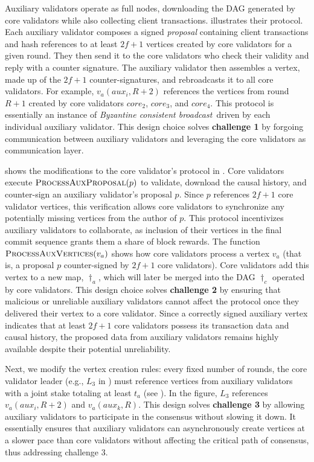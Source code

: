 Auxiliary validators operate as full nodes, downloading the DAG generated by core validators while also collecting client transactions.  illustrates their protocol. Each auxiliary validator composes a signed \emph{proposal} containing client transactions and hash references to at least $2f + 1$ vertices created by core validators for a given round. They then send it to the core validators who check their validity and reply with a counter signature. The auxiliary validator then assembles a vertex, made up of the $2f + 1$ counter-signatures, and rebroadcasts it to all core validators. For example, $v_a(aux_i, R+2)$ references the vertices from round $R+1$ created by core validators $core_2$, $core_3$, and $core_4$. This protocol is essentially an instance of \emph{Byzantine consistent broadcast}~\cite{cachin2011introduction}driven by each individual auxiliary validator.
%
This design choice solves \textbf{challenge 1} by forgoing communication between auxiliary validators and leveraging the core validators as communication layer.

 shows the modifications to the core validator's protocol in . Core validators execute $\Call{ProcessAuxProposal}{p}$ to validate, download the causal history, and counter-sign an auxiliary validator's proposal $p$. Since $p$ references $2f + 1$ core validator vertices, this verification allows core validators to synchronize any potentially missing vertices from the author of $p$. This protocol incentivizes auxiliary validators to collaborate, as inclusion of their vertices in the final commit sequence grants them a share of block rewards. The function $\Call{ProcessAuxVertices}{v_a}$ shows how core validators process a vertex $v_a$ (that is, a proposal $p$ counter-signed by $2f + 1$ core validators). Core validators add this vertex to a new map, $\dag_a$, which will later be merged into the DAG $\dag_c$ operated by core validators.
%
This design choice solves \textbf{challenge 2} by ensuring that malicious or unreliable auxiliary validators cannot affect the protocol once they delivered their vertex to a core validator. Since a correctly signed auxiliary vertex indicates that at least $2f + 1$ core validators possess its transaction data and causal history, the proposed data from auxiliary validators remains highly available despite their potential unreliability.

Next, we modify the vertex creation rules: every fixed number of rounds, the core validator leader (e.g., $L_3$ in ) must reference vertices from auxiliary validators with a joint stake totaling at least $t_a$ (see ). In the figure, $L_3$ references $v_a(aux_i, R+2)$ and $v_a(aux_k, R)$.
%
This design solves \textbf{challenge 3} by allowing auxiliary validators to participate in the consensus without slowing it down. It essentially ensures that auxiliary validators can asynchronously create vertices at a slower pace than core validators without affecting the critical path of consensus, thus addressing challenge 3.


